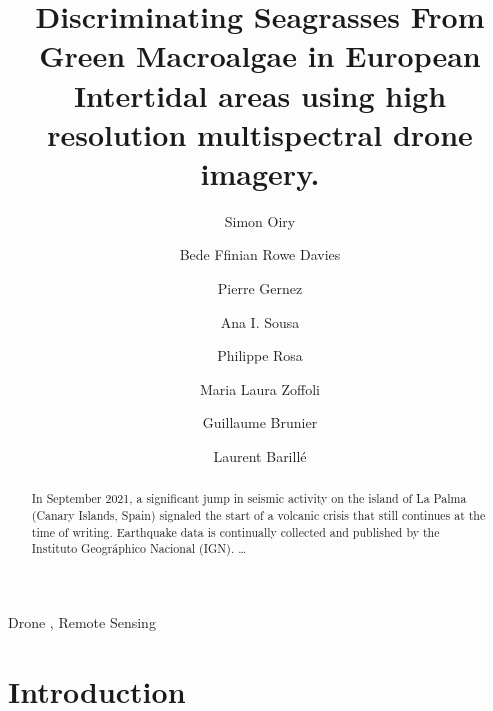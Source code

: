 \documentclass[
  number]{elsarticle}
\begin{document}
\begin{frontmatter}
\title{Discriminating Seagrasses From Green Macroalgae in European
Intertidal areas using high resolution multispectral drone imagery.}
\author[1]{Simon Oiry%
%
}
\author[1]{Bede Ffinian Rowe Davies%
%
}

\author[1]{Pierre Gernez%
%
}

\author[2]{Ana I. Sousa%
%
}

\author[1]{Philippe Rosa%
%
}

\author[3]{Maria Laura Zoffoli%
%
}

\author[4]{Guillaume Brunier%
%
}

\author[1]{Laurent Barillé%
%
}











        
\begin{abstract}
In September 2021, a significant jump in seismic activity on the island
of La Palma (Canary Islands, Spain) signaled the start of a volcanic
crisis that still continues at the time of writing. Earthquake data is
continually collected and published by the Instituto Geográphico
Nacional (IGN). \ldots{}
\end{abstract}





\begin{keyword}
    Drone \sep 
    Remote Sensing
\end{keyword}
\end{frontmatter}
    
\section{Introduction}\label{introduction}
\end{document}

